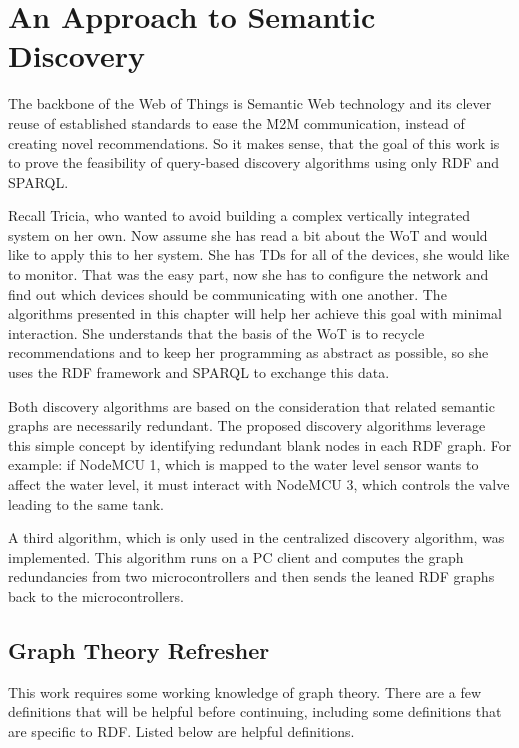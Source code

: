 \chapter{An Approach to Semantic Discovery}

The backbone of the Web of Things is Semantic Web technology and its clever reuse of established standards to ease the M2M communication, instead of creating novel recommendations. So it makes sense, that the goal of this work is to prove the feasibility of query-based discovery algorithms using only RDF and SPARQL. 

Recall Tricia, who wanted to avoid building a complex vertically integrated system on her own. Now assume she has read a bit about the WoT and would like to apply this to her system. She has TDs for all of the devices, she would like to monitor. That was the easy part, now she has to configure the network and find out which devices should be communicating with one another. The algorithms presented in this chapter will help her achieve this goal with minimal interaction. She understands that the basis of the WoT is to recycle recommendations and to keep her programming as abstract as possible, so she uses the RDF framework and SPARQL to exchange this data.

Both discovery algorithms are based on the consideration that related semantic graphs are necessarily redundant. The proposed discovery algorithms leverage this simple concept by identifying redundant blank nodes in each RDF graph. For example: if NodeMCU 1, which is mapped to the water level sensor wants to affect the water level, it must interact with NodeMCU 3, which controls the valve leading to the same tank.

A third algorithm, which is only used in the centralized discovery algorithm, was implemented. This algorithm runs on a PC client and computes the graph redundancies from two microcontrollers and then sends the leaned RDF graphs back to the microcontrollers.

\section{Graph Theory Refresher}
This work requires some working knowledge of graph theory. There are a few definitions that will be helpful before continuing, including some definitions that are specific to RDF. Listed below are helpful definitions.

